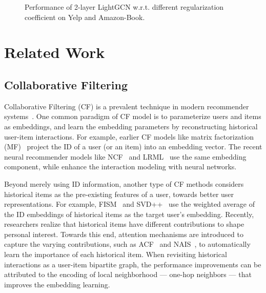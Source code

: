 \documentclass[sigconf]{acmart}
\theoremstyle{definition}
\begin{document}
\begin{figure}[t]
	\centering
	\vspace{-15pt}
	\caption{Performance of 2-layer LightGCN w.r.t. different regularization coefficient  on Yelp and Amazon-Book.} \vspace{-10pt}
	\label{fig:reg}
\end{figure}

%
 \section{Related Work}\label{sec:related}


\subsection{Collaborative Filtering}
Collaborative Filtering (CF) is a prevalent technique in modern recommender systems~\cite{YoutubeRS,PinSage}.
One common paradigm of CF model is to parameterize users and items as embeddings, and learn the embedding parameters by reconstructing historical user-item interactions.
For example, earlier CF models like matrix factorization (MF)~\cite{MF,BPRMF} project the ID of a user (or an item) into an embedding vector. The recent neural recommender models like NCF~\cite{NCF} and LRML~\cite{tay2018latent} use the same embedding component, while enhance the interaction modeling with neural networks. 






Beyond merely using ID information, another type of CF methods considers historical items as the pre-existing features of a user, towards better user representations.
For example,  FISM~\cite{FISM} and SVD++~\cite{SVD++} use the weighted average of the ID embeddings of historical items as the target user's embedding. 
Recently, researchers realize that historical items have different contributions to shape personal interest.
Towards this end, attention mechanisms are introduced to capture the varying contributions, such as ACF~\cite{ACF} and NAIS~\cite{NAIS}, to automatically learn the importance of each historical item. 
When revisiting historical interactions as a user-item bipartite graph, the performance improvements can be attributed to the encoding of local neighborhood --- one-hop neighbors --- that improves the embedding learning.
\end{document}
